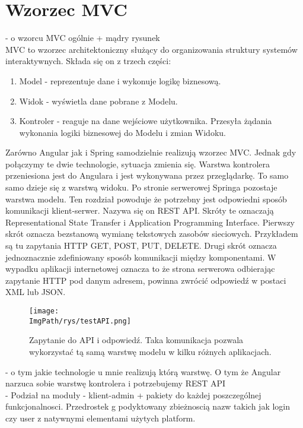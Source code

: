 \documentclass[a4paper,12pt,twoside,openany]{report}
\newcommand{\ImgPath}{.}
\begin{document}
\section{Wzorzec MVC}
- o wzorcu MVC ogólnie + mądry rysunek\\
MVC to wzorzec architektoniczny służący do organizowania struktury systemów interaktywnych. Składa się on z trzech części:
	\begin{enumerate}
		\item Model - reprezentuje dane i wykonuje logikę biznesową.
		\item Widok - wyświetla dane pobrane z Modelu.
		\item Kontroler - reaguje na dane wejściowe użytkownika. Przesyła żądania wykonania logiki biznesowej do Modelu i zmian Widoku. 
	\end{enumerate}
Zarówno Angular jak i Spring samodzielnie realizują wzorzec MVC. Jednak gdy połączymy te dwie technologie, sytuacja zmienia się. Warstwa kontrolera przeniesiona jest do Angulara i jest wykonywana przez przeglądarkę. To samo samo dzieje się z warstwą widoku. Po stronie serwerowej Springa pozostaje warstwa modelu. Ten rozdział powoduje że potrzebny jest odpowiedni sposób komunikacji klient-serwer. Nazywa się on REST API. Skróty te oznaczają Representational State Transfer i Application Programming Interface. Pierwszy skrót oznacza bezstanową wymianę tekstowych zasobów sieciowych. Przykładem są tu zapytania HTTP GET, POST, PUT, DELETE. Drugi skrót oznacza jednoznacznie zdefiniowany sposób komunikacji między komponentami. W wypadku aplikacji internetowej oznacza to że strona serwerowa odbierając zapytanie HTTP pod danym adresem, powinna zwrócić odpowiedź w postaci XML lub JSON.
		\begin{figure}[!htbp]
			\begin{center}
				\centering
				\texttt{[image: \\ImgPath/rys/testAPI.png]}
			\end{center}
			\caption{Zapytanie do API i odpowiedź. Taka komunikacja pozwala wykorzystać tą samą warstwę modelu w kilku różnych aplikacjach.}
			\label{UMLTS}
		\end{figure}
- o tym jakie technologie u mnie realizują którą warstwę. O tym że Angular narzuca sobie warstwę kontrolera i potrzebujemy REST API\\
- Podział na moduły - klient-admin + pakiety do każdej poszczególnej funkcjonalnosci. Przedrostek g podyktowany zbieżnoscią nazw takich jak login czy user z natywnymi elementami użytych platform.
\end{document}
